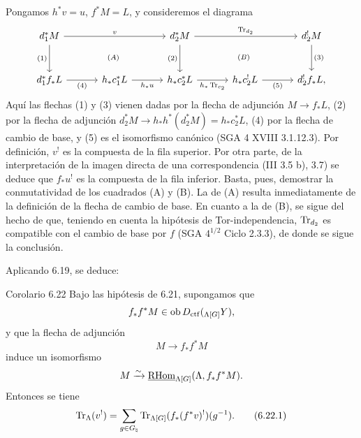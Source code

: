 Pongamos $h^*v=u$, $f^*M=L$, y consideremos el diagrama
\[
\begin{tikzcd}[column sep=3.2em,row sep=large]
d_1^*M \arrow[rr,"v"] \arrow[d,"{(1)}"'] &&
d_2^*M \arrow[rr,"\Tr_{d_2}"] \arrow[d,"{(2)}"'] &&
d_2^!M \arrow[d,"{(3)}"]\\
d_1^*f_*L \arrow[r,"{(4)}"'] &
h_*c_1^*L \arrow[r,"h_*u"'] &
h_*c_2^*L \arrow[r,"h_*\Tr_{c_2}"'] &
h_*c_2^!L \arrow[r,"{(5)}"'] &
d_2^!f_*L,
\arrow[from=1-1,to=2-3, phantom, "\scriptstyle (A)"]
\arrow[from=1-3,to=2-5, phantom, "\scriptstyle (B)"]
\end{tikzcd}
\]
Aquí las flechas (1) y (3) vienen dadas por la flecha de adjunción $M\to f_*L$, (2) por la flecha de adjunción $d_2^*M\to h_*h^*(d_2^*M)=h_*c_2^*L$, (4) por la flecha de cambio de base, y (5) es el isomorfismo canónico (SGA 4 XVIII 3.1.12.3). Por definición, $v^!$ es la compuesta de la fila superior. Por otra parte, de la interpretación de la imagen directa de una correspondencia (III 3.5 b), 3.7) se deduce que $f_*u^!$ es la compuesta de la fila inferior. Basta, pues, demostrar la conmutatividad de los cuadrados (A) y (B). La de (A) resulta inmediatamente de la definición de la flecha de cambio de base. En cuanto a la de (B), se sigue del hecho de que, teniendo en cuenta la hipótesis de Tor-independencia, $\operatorname{Tr}_{d_2}$ es compatible con el cambio de base por $f$ (SGA $4^{1/2}$ Ciclo 2.3.3), de donde se sigue la conclusión.

Aplicando 6.19, se deduce:

\begin{statement}{Corolario 6.22}
Bajo las hipótesis de 6.21, supongamos que
\[
f_*f^*M\in\operatorname{ob} D_{\mathrm{ctf}}({}_{\Lambda[G]}Y),
\]
y que la flecha de adjunción
\[
M\to f_*f^*M
\]
induce un isomorfismo
\[
M\xrightarrow{\sim}\underline{\mathrm{RHom}}_{\Lambda[G]}(\Lambda,f_*f^*M).
\]
Entonces se tiene
\begin{equation}
\operatorname{Tr}_{\Lambda}(v^!)=
\sum_{g\in G_{\natural}}\operatorname{Tr}_{\Lambda[G]}(f_*(f^*v)^!)(g^{-1}).
\tag{6.22.1}
\end{equation}
\end{statement}
